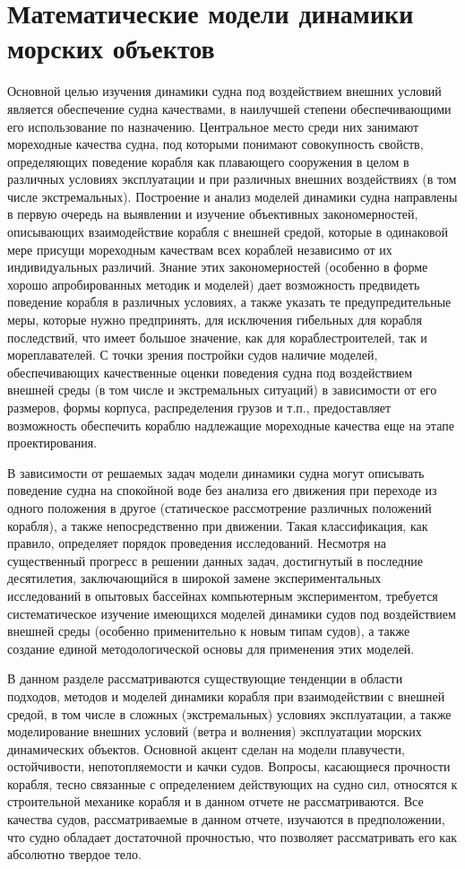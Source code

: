 \section{Математические модели динамики морских объектов}



Основной целью изучения динамики судна под воздействием внешних условий является обеспечение судна качествами, в наилучшей степени обеспечивающими его использование по назначению. Центральное место среди них занимают мореходные качества судна, под которыми понимают совокупность свойств, определяющих поведение корабля как плавающего сооружения в целом в различных условиях эксплуатации и при различных внешних воздействиях (в том числе экстремальных). Построение и анализ моделей динамики судна направлены в первую очередь на выявлении и изучение объективных закономерностей, описывающих взаимодействие корабля с внешней средой, которые в одинаковой мере присущи мореходным качествам всех кораблей независимо от их индивидуальных различий. Знание этих закономерностей (особенно в форме хорошо апробированных методик и моделей) дает возможность предвидеть поведение корабля в различных условиях, а также указать те предупредительные меры, которые нужно предпринять, для исключения гибельных для корабля последствий, что имеет большое значение, как для кораблестроителей, так и мореплавателей. С точки зрения постройки судов наличие моделей, обеспечивающих качественные оценки поведения судна под воздействием внешней среды (в том числе и экстремальных ситуаций) в зависимости от его размеров, формы корпуса, распределения грузов и т.п., предоставляет возможность обеспечить кораблю надлежащие мореходные качества еще  на этапе проектирования.

В зависимости от решаемых задач модели динамики судна могут описывать поведение судна на спокойной воде без анализа его движения при переходе из одного положения в другое (статическое рассмотрение различных положений корабля), а также непосредственно при движении. Такая классификация, как правило, определяет порядок проведения исследований. Несмотря на существенный прогресс в решении данных задач, достигнутый в последние десятилетия, заключающийся в широкой замене экспериментальных исследований в опытовых бассейнах компьютерным экспериментом, требуется систематическое изучение имеющихся моделей динамики судов под воздействием внешней среды (особенно применительно к новым типам судов), а также создание единой методологической основы для применения этих моделей.

В данном разделе рассматриваются существующие тенденции в области подходов, методов и моделей динамики корабля при взаимодействии с внешней средой, в том числе в сложных (экстремальных) условиях эксплуатации, а также моделирование внешних условий (ветра и волнения) эксплуатации морских динамических объектов. Основной акцент сделан на модели плавучести, остойчивости, непотопляемости и качки судов. Вопросы, касающиеся прочности корабля, тесно связанные с определением действующих на судно сил, относятся к строительной механике корабля и в данном отчете не рассматриваются. Все качества судов, рассматриваемые в данном отчете, изучаются в предположении, что судно обладает достаточной прочностью, что позволяет рассматривать его как абсолютно твердое тело.

